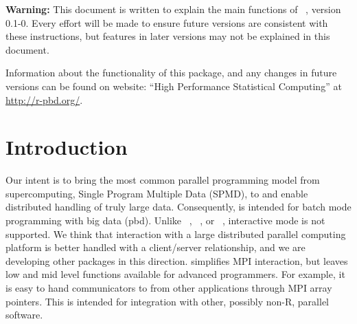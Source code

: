 
{\color{red} \bf Warning:} This document is written to explain the main
functions of ~\citep{Chen2012}, version 0.1-0.
Every effort will be made to ensure future versions are consistent with
these instructions, but features in later versions may not be explained
in this document.

Information about the functionality of this package,
and any changes in future versions can be found on website:
``High Performance Statistical Computing'' at
\url{http://r-pbd.org/}.

\section[Introduction]{Introduction}
\label{sec:introduction}

Our intent is to bring the most common parallel programming model from
supercomputing, Single Program Multiple Data (SPMD), to 
and enable distributed handling of truly large data. Consequently,
 is intended for batch mode programming with big data
(pbd). Unlike ~\citep{Yu2010},
~\citep{Tierney2012}, or ~\citep{Rcore},
interactive mode is not supported.  We think that interaction with a
large distributed parallel computing platform is better handled with a
client/server relationship, and we are developing other packages in
this direction.   simplifies MPI interaction, but leaves
low and mid level functions available for advanced programmers. For
example, it is easy to hand communicators to  from other
applications through MPI array pointers. This is intended for
integration with other, possibly non-R, parallel software.


